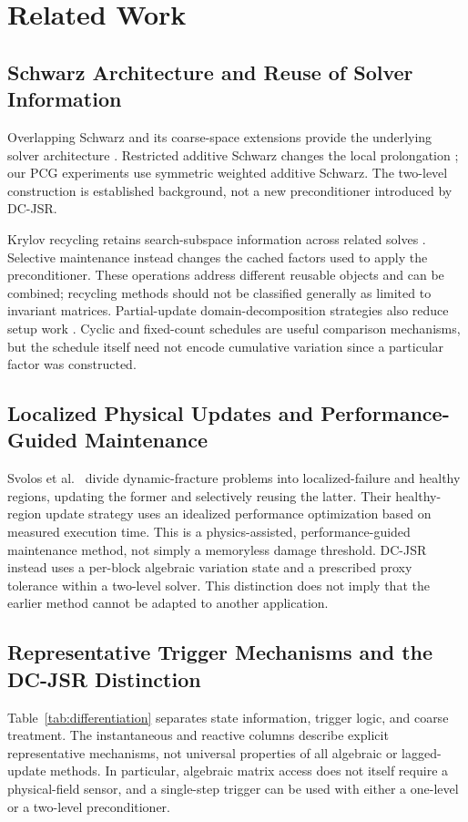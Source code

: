 \documentclass[preprint,12pt,3p]{elsarticle}
\begin{document}
\section{Related Work}
\label{sec:related_work}

\subsection{Schwarz Architecture and Reuse of Solver Information}
Overlapping Schwarz and its coarse-space extensions provide the underlying
solver architecture \cite{schwarz1870ueber,dryja1994domain,toselli2005domain}.
Restricted additive Schwarz changes the local prolongation
\cite{cai1999restricted}; our PCG experiments use symmetric weighted additive
Schwarz. The two-level construction is established background, not a new
preconditioner introduced by DC-JSR.

Krylov recycling retains search-subspace information across related solves
\cite{parks2006recycling,kilmer2006recycling}. Selective maintenance instead
changes the cached factors used to apply the preconditioner. These operations
address different reusable objects and can be combined; recycling methods
should not be classified generally as limited to invariant matrices.
Partial-update domain-decomposition strategies also reduce setup work
\cite{berenguer2015asynchronous,carreno2022strategies}. Cyclic and fixed-count
schedules are useful comparison mechanisms, but the schedule itself need not
encode cumulative variation since a particular factor was constructed.

\subsection{Localized Physical Updates and Performance-Guided Maintenance}
Svolos et al.\ \cite{svolos2020updating} divide dynamic-fracture problems into
localized-failure and healthy regions, updating the former and selectively
reusing the latter. Their healthy-region update strategy uses an idealized
performance optimization based on measured execution time. This is a
physics-assisted, performance-guided maintenance method, not simply a
memoryless damage threshold. DC-JSR instead uses a per-block algebraic
variation state and a prescribed proxy tolerance within a two-level solver.
This distinction does not imply that the earlier method cannot be adapted
to another application.

\subsection{Representative Trigger Mechanisms and the DC-JSR Distinction}
Table~\ref{tab:differentiation} separates state information, trigger logic, and
coarse treatment. The instantaneous and reactive columns describe explicit
representative mechanisms, not universal properties of all algebraic or
lagged-update methods. In particular, algebraic matrix access does not itself
require a physical-field sensor, and a single-step trigger can be used with
either a one-level or a two-level preconditioner.
\end{document}
